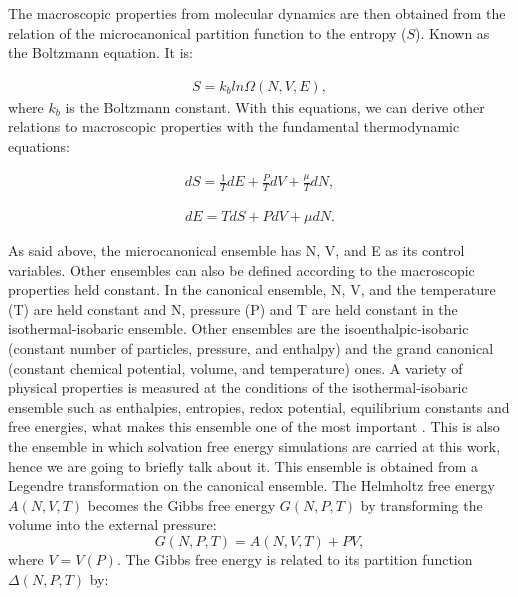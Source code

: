 The macroscopic properties from molecular dynamics are then obtained from the relation of the microcanonical partition function to the entropy ($S$). Known as the Boltzmann equation. It is:

\begin{equation}
\begin{aligned}
S = k_{b} ln \Omega (N,V,E), 
\end{aligned}
\end{equation}
where $k_{b}$ is the Boltzmann constant. With this equations, we can derive other relations to macroscopic properties with the fundamental thermodynamic equations:

\begin{equation}
\begin{aligned}
dS = \frac{1}{T} dE + \frac{P}{T} dV + \frac{\mu}{T} dN,
\end{aligned}
\end{equation}

\begin{equation}
\begin{aligned}
dE = T dS + P dV + \mu dN .
\end{aligned}
\end{equation}

As said above, the microcanonical ensemble  has  N, V, and E as its control variables. Other ensembles can also be defined according to the macroscopic properties held constant.  In the canonical ensemble,  N, V, and the temperature (T) are held constant and  N, pressure (P) and T are held constant in the isothermal-isobaric ensemble. Other ensembles are the isoenthalpic-isobaric (constant number of particles, pressure, and enthalpy) and the grand canonical (constant chemical potential, volume, and temperature) ones. A variety of physical properties is measured at the conditions of the isothermal-isobaric ensemble such as enthalpies, entropies, redox potential, equilibrium constants and free energies, what makes this ensemble one of the most important \cite{tuckerman}. This is also the ensemble in which solvation free energy simulations are carried at this work, hence we are going to briefly talk about it. This ensemble is obtained from a Legendre transformation on the canonical ensemble. The Helmholtz free energy $A(N,V,T)$ becomes the Gibbs free energy $G(N,P,T)$ by transforming the volume into the external pressure:
\begin{equation}
G(N,P,T) = A(N,V,T) + PV,
\end{equation}
where $V = V(P)$. The Gibbs free energy is related to its partition function $\Delta (N,P,T)$ by:

